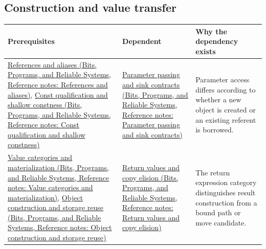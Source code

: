 \subsection{Construction and value transfer}\label{appendix-4ad47bdd269a-construction-and-value-transfer}

{\def\LTcaptype{none} %
\begin{longtable}[]{@{}
  >{\raggedright\arraybackslash}p{}
  >{\raggedright\arraybackslash}p{}
  >{\raggedright\arraybackslash}p{}@{}}
\toprule\noalign{}
\begin{minipage}[b]{\linewidth}\raggedright
Prerequisites
\end{minipage} & \begin{minipage}[b]{\linewidth}\raggedright
Dependent
\end{minipage} & \begin{minipage}[b]{\linewidth}\raggedright
Why the dependency exists
\end{minipage} \\
\midrule\noalign{}
\endhead
\bottomrule\noalign{}
\endlastfoot
\href{../01-Bits-Programs-and-Reliable-Systems/main.pdf\#nameddest=appendix-d6d562ca9fbb}{References and aliases (Bits, Programs, and Reliable Systems, Reference notes: References and aliases)}, \href{../01-Bits-Programs-and-Reliable-Systems/main.pdf\#nameddest=appendix-c25d60fed375}{Const qualification and shallow constness (Bits, Programs, and Reliable Systems, Reference notes: Const qualification and shallow constness)} & \href{../01-Bits-Programs-and-Reliable-Systems/main.pdf\#nameddest=appendix-d5908f75721f}{Parameter passing and sink contracts (Bits, Programs, and Reliable Systems, Reference notes: Parameter passing and sink contracts)} & Parameter access differs according to whether a new object is created or an existing referent is borrowed. \\
\href{../01-Bits-Programs-and-Reliable-Systems/main.pdf\#nameddest=appendix-1121b30eaeb0}{Value categories and materialization (Bits, Programs, and Reliable Systems, Reference notes: Value categories and materialization)}, \href{../01-Bits-Programs-and-Reliable-Systems/main.pdf\#nameddest=appendix-a82f9c438857}{Object construction and storage reuse (Bits, Programs, and Reliable Systems, Reference notes: Object construction and storage reuse)} & \href{../01-Bits-Programs-and-Reliable-Systems/main.pdf\#nameddest=appendix-b08d3788c5c6}{Return values and copy elision (Bits, Programs, and Reliable Systems, Reference notes: Return values and copy elision)} & The return expression category distinguishes result construction from a bound path or move candidate. \\

\end{longtable}}
